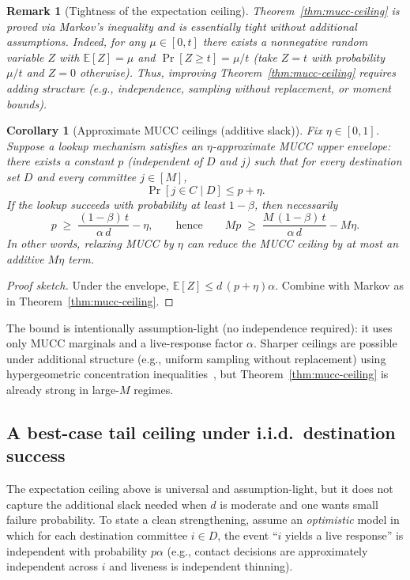 \documentclass[11pt]{article}
\newtheorem{corollary}{Corollary}
\newtheorem{remark}{Remark}
\newcommand{\E}{\mathbb{E}}
\begin{document}
\begin{remark}[Tightness of the expectation ceiling]
Theorem~\ref{thm:mucc-ceiling} is proved via Markov's inequality and is essentially tight without additional assumptions.
Indeed, for any $\mu\in[0,t]$ there exists a nonnegative random variable $Z$ with $\E[Z]=\mu$ and $\Pr[Z\ge t]=\mu/t$ (take $Z=t$ with probability $\mu/t$ and $Z=0$ otherwise).
Thus, improving Theorem~\ref{thm:mucc-ceiling} requires adding structure (e.g., independence, sampling without replacement, or moment bounds).
\end{remark}

\begin{corollary}[Approximate MUCC ceilings (additive slack)]
\label{cor:approx-mucc}
Fix $\eta\in[0,1]$.
Suppose a lookup mechanism satisfies an \emph{$\eta$-approximate MUCC upper envelope}:
there exists a constant $p$ (independent of $D$ and $j$) such that for every destination set $D$ and every committee $j\in[M]$,
\[
\Pr[j\in C\mid D] \le p+\eta.
\]
If the lookup succeeds with probability at least $1-\beta$, then necessarily
\[
p \;\ge\; \frac{(1-\beta)\,t}{\alpha\,d}-\eta,
\qquad\text{hence}\qquad
Mp \;\ge\; \frac{M\,(1-\beta)\,t}{\alpha\,d}-M\eta.
\]
In other words, relaxing MUCC by $\eta$ can reduce the MUCC ceiling by at most an additive $M\eta$ term.
\end{corollary}

\begin{proof}[Proof sketch]
Under the envelope, $\E[Z]\le d\,(p+\eta)\alpha$.
Combine with Markov as in Theorem~\ref{thm:mucc-ceiling}.
\end{proof}


The bound is intentionally assumption-light (no independence required): it uses only MUCC marginals and a live-response factor $\alpha$.
Sharper ceilings are possible under additional structure (e.g., uniform sampling without replacement) using hypergeometric concentration inequalities~\cite{serfling1974sampling,bardenet2015withoutreplacement}, but Theorem~\ref{thm:mucc-ceiling} is already strong in large-$M$ regimes.


\subsection{A best-case tail ceiling under i.i.d.\ destination success}
The expectation ceiling above is universal and assumption-light, but it does not capture the additional slack needed when $d$ is moderate and one wants small failure probability.
To state a clean strengthening, assume an \emph{optimistic} model in which for each destination committee $i\in D$,
the event ``$i$ yields a live response'' is independent with probability $p\alpha$ (e.g., contact decisions are approximately independent across $i$ and liveness is independent thinning).
\end{document}
